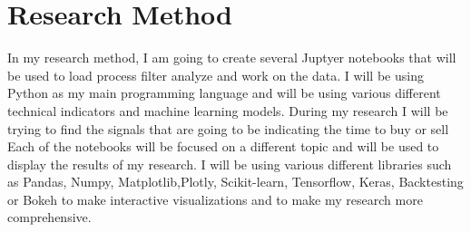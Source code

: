 \documentclass{imc-inf}
\begin{document}
\section{Research Method} 
In my research method, I am going to create several Juptyer notebooks that will
be used to load process filter analyze and work on the data. I will be using
Python as my main programming language and will be using various different
technical indicators and machine learning models. During my research I will be  trying to find the signals that are going to be indicating the time to buy or sell 
Each of the notebooks will be focused on a different topic and will be used to display the results of my research. I will be using various different libraries such as
Pandas, Numpy, Matplotlib,Plotly, Scikit-learn, Tensorflow, Keras, Backtesting or Bokeh to make interactive visualizations and to make my research more comprehensive.
\end{document}
